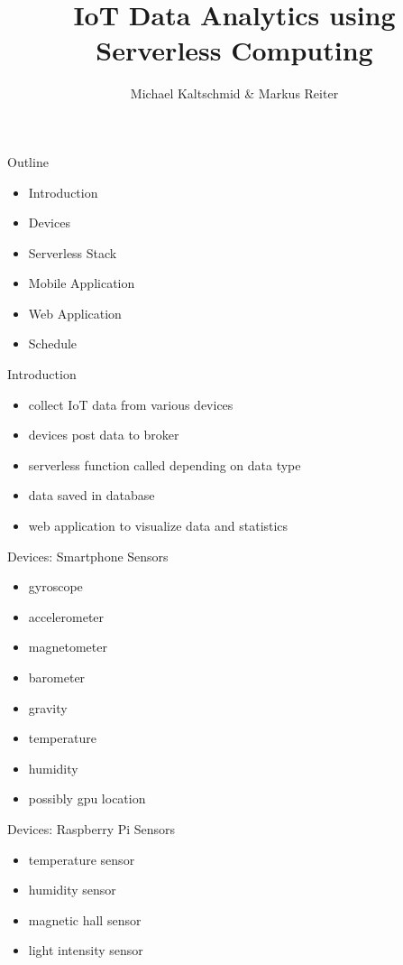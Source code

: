 \documentclass[aspectratio=1610]{beamer}
\title{IoT Data Analytics using Serverless Computing}
\author{Michael Kaltschmid \& Markus Reiter}
\date{}
\begin{document}
  \maketitle

  \begin{frame}{Outline}
    \begin{itemize}
      \item Introduction
      \item Devices
      \item Serverless Stack
      \item Mobile Application
      \item Web Application
      \item Schedule
    \end{itemize}
  \end{frame}

  \begin{frame}{Introduction}
    \begin{itemize}
      \item collect IoT data from various devices
      \item devices post data to broker
      \item serverless function called depending on data type
      \item data saved in database
      \item web application to visualize data and statistics
    \end{itemize}
  \end{frame}

  \begin{frame}{Devices: Smartphone}
    Sensors

    \begin{itemize}
      \item gyroscope
      \item accelerometer
      \item magnetometer
      \item barometer
      \item gravity
      \item temperature
      \item humidity
      \item possibly gpu location
    \end{itemize}
  \end{frame}

  \begin{frame}{Devices: Raspberry Pi}
    Sensors

    \begin{itemize}
      \item temperature sensor
      \item humidity sensor
      \item magnetic hall sensor
      \item light intensity sensor
    \end{itemize}
  \end{frame}
\end{document}
